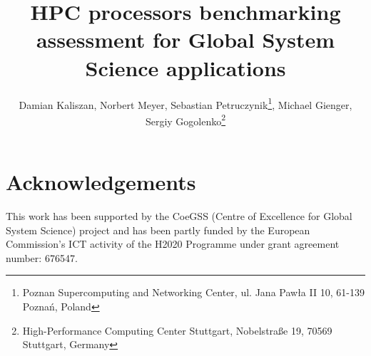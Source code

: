 \documentclass{superfri}
\begin{document}
\author{Damian Kaliszan, Norbert Meyer, Sebastian Petruczynik\footnote{\label{psnc}Poznan Supercomputing and Networking Center, ul. Jana Paw\l a II 10, 61-139 Pozna\'n, Poland}, Michael Gienger, Sergiy Gogolenko\footnote{\label{hlrs}High-Performance Computing Center Stuttgart, Nobelstra\ss{}e 19, 70569 Stuttgart, Germany}}



\title{HPC processors benchmarking assessment for Global System Science applications}

\maketitle{}












\section*{Acknowledgements}
This work has been supported by the CoeGSS (Centre of Excellence for Global System Science) project and has been partly funded by the European Commission's ICT activity of the H2020 Programme under grant agreement number: 676547.

\openaccess


\end{document}
